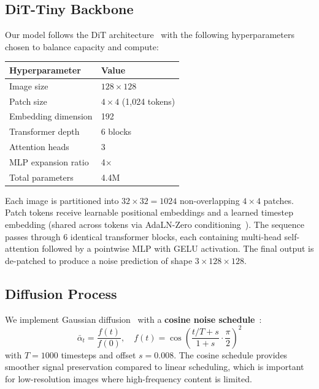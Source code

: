 \documentclass[11pt,letterpaper]{article}
\begin{document}
\subsection{DiT-Tiny Backbone}

Our model follows the DiT architecture~\cite{dit2023} with the following
hyperparameters chosen to balance capacity and compute:

\begin{center}
\begin{tabular}{ll}
\toprule
\textbf{Hyperparameter} & \textbf{Value} \\
\midrule
Image size & $128 \times 128$ \\
Patch size & $4 \times 4$ (1,024 tokens) \\
Embedding dimension & 192 \\
Transformer depth & 6 blocks \\
Attention heads & 3 \\
MLP expansion ratio & 4$\times$ \\
Total parameters & 4.4M \\
\bottomrule
\end{tabular}
\end{center}

Each image is partitioned into $32 \times 32 = 1024$ non-overlapping $4 \times 4$ patches.
Patch tokens receive learnable positional embeddings and a learned timestep embedding
(shared across tokens via AdaLN-Zero conditioning~\cite{dit2023}). The sequence passes
through 6 identical transformer blocks, each containing multi-head self-attention
followed by a pointwise MLP with GELU activation. The final output is de-patched to
produce a noise prediction of shape $3 \times 128 \times 128$.

\subsection{Diffusion Process}

We implement Gaussian diffusion~\cite{ddpm2020} with a \textbf{cosine noise
schedule}~\cite{improved_ddpm2021}:
\begin{equation}
  \bar{\alpha}_t = \frac{f(t)}{f(0)}, \quad
  f(t) = \cos\!\left(\frac{t/T + s}{1 + s} \cdot \frac{\pi}{2}\right)^2
\end{equation}
with $T = 1000$ timesteps and offset $s = 0.008$. The cosine schedule provides smoother
signal preservation compared to linear scheduling, which is important for low-resolution
images where high-frequency content is limited.
\end{document}
